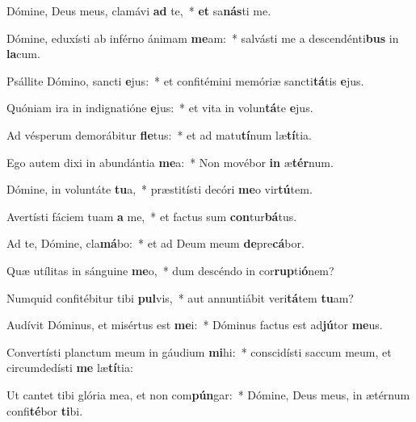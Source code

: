 \item Dómine, Deus meus, clamávi \textbf{ad} te,~* \textbf{et} sa\textbf{nás}ti me.
\item Dómine, eduxísti ab inférno ánimam \textbf{me}am:~* salvásti me a descendénti\textbf{bus} in \textbf{la}cum.
\item Psállite Dómino, sancti \textbf{e}jus:~* et confitémini memóriæ sancti\textbf{tá}tis \textbf{e}jus.
\item Quóniam ira in indignatióne \textbf{e}jus:~* et vita in volun\textbf{tá}te \textbf{e}jus.
\item Ad vésperum demorábitur \textbf{fle}tus:~* et ad matu\textbf{tí}num læ\textbf{tí}tia.
\item Ego autem dixi in abundántia \textbf{me}a:~* Non movébor \textbf{in} æ\textbf{tér}num.
\item Dómine, in voluntáte \textbf{tu}a,~* præstitísti decóri \textbf{me}o vir\textbf{tú}tem.
\item Avertísti fáciem tuam \textbf{a} me,~* et factus sum \textbf{con}tur\textbf{bá}tus.
\item Ad te, Dómine, cla\textbf{má}bo:~* et ad Deum meum \textbf{de}pre\textbf{cá}bor.
\item Quæ utílitas in sánguine \textbf{me}o,~* dum descéndo in cor\textbf{rup}ti\textbf{ó}nem?
\item Numquid confitébitur tibi \textbf{pul}vis,~* aut annuntiábit veri\textbf{tá}tem \textbf{tu}am?
\item Audívit Dóminus, et misértus est \textbf{me}i:~* Dóminus factus est ad\textbf{jú}tor \textbf{me}us.
\item Convertísti planctum meum in gáudium \textbf{mi}hi:~* conscidísti saccum meum, et circumdedísti \textbf{me} læ\textbf{tí}tia:
\item Ut cantet tibi glória mea, et non com\textbf{pún}gar:~* Dómine, Deus meus, in ætérnum confi\textbf{té}bor \textbf{ti}bi.
